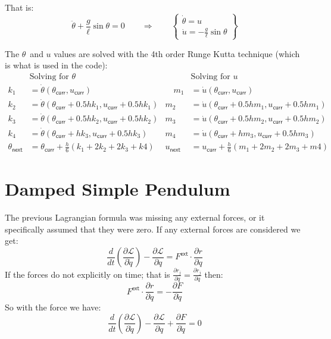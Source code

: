 \documentclass[letterpaper,8pt]{article}
\begin{document}
That is:
\[
\ddot{\theta} + \frac{g}{\ell} \sin \theta = 0 
\qquad\Rightarrow\qquad
\left\{ 
\begin{array}{l}
\dot{\theta} = u \\
\dot{u} = - \frac{g}{\ell} \sin \theta
\end{array}
\right\}
\]

The $\theta$\ and $u$ values are solved with the 4th order Runge Kutta technique (which is what is used in the code):
\begin{align*}
    & \text{Solving for $\theta$}                                                   &           & \text{Solving for $u$} \\
k_1 &= \dot{\theta} (\theta_\mathsf{curr}, u_\mathsf{curr})                         &\quad  m_1 &= \dot{u}(\theta_\mathsf{curr}, u_\mathsf{curr}) \\
k_2 &= \dot{\theta} (\theta_\mathsf{curr} + 0.5 hk_1, u_\mathsf{curr} + 0.5 hk_1)   &       m_2 &= \dot{u}(\theta_\mathsf{curr} + 0.5 hm_1, u_\mathsf{curr} + 0.5 hm_1) \\
k_3 &= \dot{\theta} (\theta_\mathsf{curr} + 0.5 hk_2, u_\mathsf{curr} + 0.5 hk_2)   &       m_3 &= \dot{u}(\theta_\mathsf{curr} + 0.5 hm_2, u_\mathsf{curr} + 0.5 hm_2) \\
k_4 &= \dot{\theta} (\theta_\mathsf{curr} + hk_3, u_\mathsf{curr} + 0.5 hk_3)       &       m_4 &= \dot{u}(\theta_\mathsf{curr} + hm_3, u_\mathsf{curr} + 0.5 hm_3) \\
\theta_\mathsf{next} &= \theta_\mathsf{curr} + \frac{h}{6} (k_1 + 2k_2 + 2k_3 + k4) & u_\mathsf{next} &= u_\mathsf{curr} + \frac{h}{6} (m_1 + 2m_2 + 2m_3 + m4)
\end{align*}


\section{Damped Simple Pendulum}

The previous Lagrangian formula was missing any external forces, or it specifically assumed that they were zero.  If any
external forces are considered we get:
\[
\frac{d}{dt}\left( \frac{\partial\mathcal{L}}{\partial \dot{q}} \right) -
\frac{\partial \mathcal{L}}{\partial q} = F^\mathsf{ext} \cdot \frac{\partial r}{\partial q}
\]
If the forces do not explicitly on time; that is $\frac{\partial r_j}{\partial q} = \frac{\partial \dot{r}_j }{\partial \dot{q}} $ 
then:
\[
F^\mathsf{ext} \cdot \frac{\partial r}{\partial q} = - \frac{\partial F}{\partial \dot{q}}
\]
So with the force we have:
\[
\frac{d}{dt}\left( \frac{\partial\mathcal{L}}{\partial \dot{q}} \right) -
\frac{\partial \mathcal{L}}{\partial q} + \frac{\partial F}{\partial \dot{q}} = 0
\]
\end{document}

